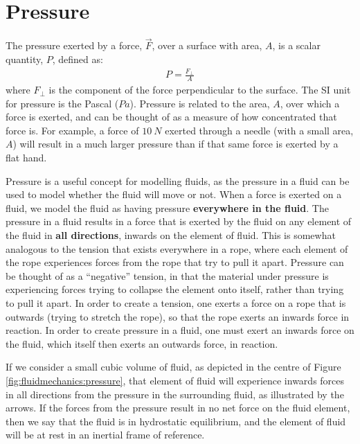 \section{Pressure}
The pressure exerted by a force, $\vec F$, over a surface with area, $A$, is a scalar quantity, $P$, defined as:
\begin{align*}
P=\frac{F_\perp}{A}
\end{align*}
where $F_\perp$ is the component of the force perpendicular to the surface. The SI unit for pressure is the Pascal ($\si{Pa}$). Pressure is related to the area, $A$, over which a force is exerted, and can be thought of as a measure of how concentrated that force is. For example, a force of $\SI{10}{N}$ exerted through a needle (with a small area, $A$) will result in a much larger pressure than if that same force is exerted by a flat hand. 

Pressure is a useful concept for modelling fluids, as the pressure in a fluid can be used to model whether the fluid will move or not. When a force is exerted on a fluid, we model the fluid as having pressure \textbf{everywhere in the fluid}. The pressure in a fluid results in a force that is exerted by the fluid on any element of the fluid in \textbf{all directions}, inwards on the element of fluid. This is somewhat analogous to the tension that exists everywhere in a rope, where each element of the rope experiences forces from the rope that try to pull it apart. Pressure can be thought of as a ``negative'' tension, in that the material under pressure is experiencing forces trying to collapse the element onto itself, rather than trying to pull it apart. In order to create a tension, one exerts a force on a rope that is outwards (trying to stretch the rope), so that the rope exerts an inwards force in reaction. In order to create pressure in a fluid, one must exert an inwards force on the fluid, which itself then exerts an outwards force, in reaction.

If we consider a small cubic volume of fluid, as depicted in the centre of Figure \ref{fig:fluidmechanics:pressure}, that element of fluid will experience inwards forces in all directions from the pressure in the surrounding fluid, as illustrated by the arrows. If the forces from the pressure result in no net force on the fluid element, then we say that the fluid is in hydrostatic equilibrium, and the element of fluid will be at rest in an inertial frame of reference.

